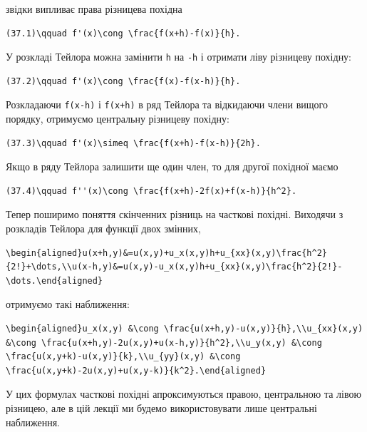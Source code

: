 \documentclass[
  ukrainian,
]{article}
\begin{document}
звідки випливає права різницева похідна

\begin{verbatim}
(37.1)\qquad f'(x)\cong \frac{f(x+h)-f(x)}{h}.
\end{verbatim}

У розкладі Тейлора можна замінити \texttt{h} на \texttt{-h} і отримати
ліву різницеву похідну:

\begin{verbatim}
(37.2)\qquad f'(x)\cong \frac{f(x)-f(x-h)}{h}.
\end{verbatim}

Розкладаючи \texttt{f(x-h)} і \texttt{f(x+h)} в ряд Тейлора та
відкидаючи члени вищого порядку, отримуємо центральну різницеву похідну:

\begin{verbatim}
(37.3)\qquad f'(x)\simeq \frac{f(x+h)-f(x-h)}{2h}.
\end{verbatim}

Якщо в ряду Тейлора залишити ще один член, то для другої похідної маємо

\begin{verbatim}
(37.4)\qquad f''(x)\cong \frac{f(x+h)-2f(x)+f(x-h)}{h^2}.
\end{verbatim}

Тепер поширимо поняття скінченних різниць на часткові похідні. Виходячи
з розкладів Тейлора для функції двох змінних,

\begin{verbatim}
\begin{aligned}u(x+h,y)&=u(x,y)+u_x(x,y)h+u_{xx}(x,y)\frac{h^2}{2!}+\dots,\\u(x-h,y)&=u(x,y)-u_x(x,y)h+u_{xx}(x,y)\frac{h^2}{2!}-\dots.\end{aligned}
\end{verbatim}

отримуємо такі наближення:

\begin{verbatim}
\begin{aligned}u_x(x,y) &\cong \frac{u(x+h,y)-u(x,y)}{h},\\u_{xx}(x,y) &\cong \frac{u(x+h,y)-2u(x,y)+u(x-h,y)}{h^2},\\u_y(x,y) &\cong \frac{u(x,y+k)-u(x,y)}{k},\\u_{yy}(x,y) &\cong \frac{u(x,y+k)-2u(x,y)+u(x,y-k)}{k^2}.\end{aligned}
\end{verbatim}

У цих формулах часткові похідні апроксимуються правою, центральною та
лівою різницею, але в цій лекції ми будемо використовувати лише
центральні наближення.
\end{document}
